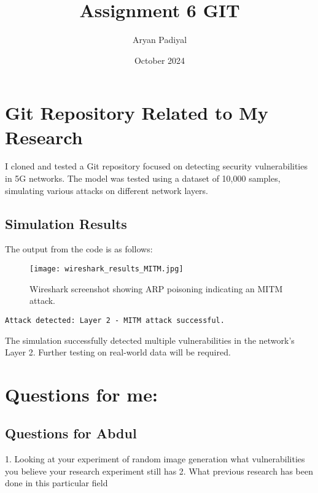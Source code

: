 \documentclass[12pt]{article}
\title{Assignment 6 GIT}
\author{Aryan Padiyal}
\date{October 2024}
\begin{document}
\maketitle

\section{Git Repository Related to My Research}
I cloned and tested a Git repository focused on detecting security vulnerabilities in 5G networks. The model was tested using a dataset of 10,000 samples, simulating various attacks on different network layers.

\subsection{Simulation Results}
The output from the code is as follows:
\begin{figure}[H]
  \centering
  \texttt{[image: wireshark\_results\_MITM.jpg]} %
  \caption{Wireshark screenshot showing ARP poisoning indicating an MITM attack.}
\end{figure}

\begin{verbatim}
Attack detected: Layer 2 - MITM attack successful.
\end{verbatim}

The simulation successfully detected multiple vulnerabilities in the network's Layer 2. Further testing on real-world data will be required.

\section{Questions for me:}

\subsection{Questions for Abdul}
1. Looking at your experiment of random image generation what vulnerabilities you believe your research experiment still has
2. What previous research has been done in this particular field
\end{document}
